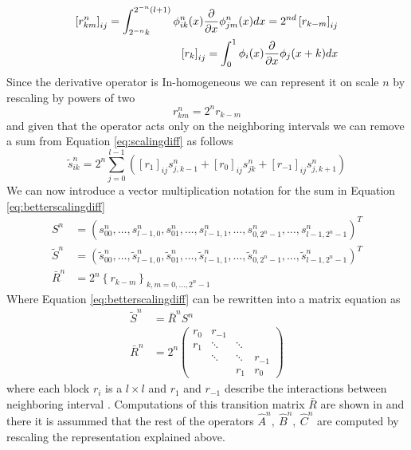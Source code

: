\documentclass[../master_thesis.tex]{subfiles}
\begin{document}
\begin{align}
\left[r_{k m}^{n}\right]_{i j}=\int_{2^{-n} k}^{2^{-n}(l+1)} \phi_{i k}^{n}(x) \frac{\partial}{\partial x} \phi_{j m}^{n}(x) d x=2^{n d}\left[r_{k-m}\right]_{i j}\\
\left[r_{k}\right]_{i j}=\int_{0}^{1} \phi_{i}(x) \frac{\partial}{\partial x} \phi_{j}(x+k) d x
\end{align}
Since the derivative operator is In-homogeneous we can represent it on scale $n$
by rescaling by powers of two
\begin{equation}
  r_{k m}^{n}=2^{n} r_{k-m}
\end{equation}
and given that the operator acts only on the neighboring intervals we can remove a sum from
Equation \ref{eq:scalingdiff} as follows
\begin{equation}\label{eq:betterscalingdiff}
\tilde{s}_{i k}^{n}=2^{n} \sum_{j=0}^{l-1}\left(\left[r_{1}\right]_{i j} s_{j, k-1}^{n}+\left[r_{0}\right]_{i j} s_{j k}^{n}+\left[r_{-1}\right]_{i j} s_{j, k+1}^{n}\right)
\end{equation}
We can now introduce a vector multiplication notation for the sum in Equation
\ref{eq:betterscalingdiff}
\begin{equation}
\begin{aligned}
  S^{n} &=\left( s_{00}^{n}, \ldots, s_{l-1,0}^{n}, s_{01}^{n},
  \ldots, s_{l-1,1}^{n}, \ldots, s_{0,2^{n}-1}^{n}, \ldots, s_{l-1,2^{n}-1}^{n}
  \right)^{T} \\
  \tilde{S}^{n} &=\left(\tilde{s}_{00}^{n}, \ldots, \tilde{s}_{l-1,0}^{n},
  \tilde{s}_{01}^{n}, \ldots, \tilde{s}_{l-1,1}^{n}, \ldots,
  \tilde{s}_{0,2^{n}-1}^{n}, \ldots, \tilde{s}_{l-1,2^{n}-1}^{n}\right)^{T}\\
  \bar{R}^{n} &=2^{n}\left\{r_{k-m}\right\}_{k, m=0, \ldots, 2^{n}-1}
\end{aligned}
\end{equation}
Where Equation \ref{eq:betterscalingdiff} can be rewritten into a matrix equation
as
\begin{align}
\tilde{S}^{n}&=\bar{R}^{n} S^{n}\\
\bar{R}^{n}&=2^{n}
\begin{pmatrix}
  r_0 & r_{-1} &  &  \\
  r_1 & \ddots & \ddots & \\
   & \ddots & \ddots & r_{-1} \\
   & & r_1 & r_0
\end{pmatrix}
\end{align}
where each block $r_i$ is a $l\times l$ and $r_1$ and  $r_{-1}$ describe the interactions
between neighboring interval \cite{Beylkin1999AdaptiveSO}.
Computations of this transition matrix $\bar{R}$ are shown in \cite{Beylkin1999AdaptiveSO}
and there it is assummed that the rest of the operators $\hat{A}^n,\ \hat{B}^n,\ \hat{C}^n$
are computed by rescaling the representation explained above.
\end{document}
